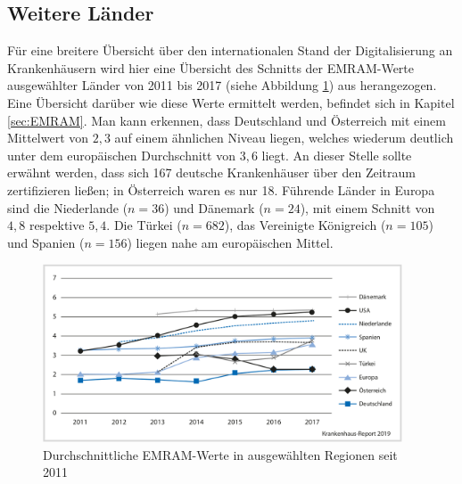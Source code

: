 \subsection{Weitere Länder}
Für eine breitere Übersicht über den internationalen Stand der Digitalisierung an Krankenhäusern wird hier eine Übersicht des Schnitts der EMRAM-Werte ausgewählter Länder von 2011 bis 2017 (siehe Abbildung \ref{fig:andere_laender}) aus \cite{Stephani2019} herangezogen. Eine Übersicht darüber wie diese Werte ermittelt werden, befindet sich in Kapitel \ref{sec:EMRAM}. Man kann erkennen, dass Deutschland und Österreich mit einem Mittelwert von $2,3$ auf einem ähnlichen Niveau liegen, welches wiederum deutlich unter dem europäischen Durchschnitt von $3,6$ liegt. An dieser Stelle sollte erwähnt werden, dass sich 167 deutsche Krankenhäuser über den Zeitraum zertifizieren ließen; in Österreich waren es nur 18. Führende Länder in Europa sind die Niederlande ($n=36$) und Dänemark ($n=24$), mit einem Schnitt von $4,8$ respektive $5,4$. Die Türkei ($n=682$), das Vereinigte Königreich ($n=105$) und Spanien ($n=156$) liegen nahe am europäischen Mittel.
\begin{figure}[ht]
	\centering
	\includegraphics[width=0.95\textwidth]{Bilder/laendervergleich_EMRAM_Stephani_2019.png}
	\caption{Durchschnittliche EMRAM-Werte in ausgewählten Regionen seit 2011 \parencite{Stephani2019}}
	\label{fig:andere_laender}
\end{figure}
